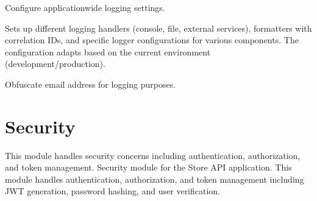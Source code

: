 \documentclass[letterpaper,10pt,openany,oneside,english]{sphinxmanual}
\begin{document}
\begin{savenotes}\begin{fulllineitems}
\label{\detokenize{modules/config:storeapi.logging_conf.configure_logging}}
\pysigstartsignatures
{}
\pysigstopsignatures
\sphinxAtStartPar
Configure application\sphinxhyphen{}wide logging settings.

\sphinxAtStartPar
Sets up different logging handlers (console, file, external services),
formatters with correlation IDs, and specific logger configurations
for various components. The configuration adapts based on the current
environment (development/production).

\end{fulllineitems}\end{savenotes}


\begin{savenotes}\begin{fulllineitems}
\label{\detokenize{modules/config:storeapi.logging_conf.obfuscated}}
\pysigstartsignatures
{}
\pysigstopsignatures
\sphinxAtStartPar
Obfuscate email address for logging purposes.

\end{fulllineitems}\end{savenotes}


\sphinxstepscope


\chapter{Security}
\label{\detokenize{modules/security:security}}\label{\detokenize{modules/security::doc}}
\sphinxAtStartPar
This module handles security concerns including authentication, authorization, and token management.
\label{\detokenize{modules/security:module-storeapi.security}}
\sphinxAtStartPar
Security module for the Store API application.
This module handles authentication, authorization, and token management
including JWT generation, password hashing, and user verification.
\end{document}
